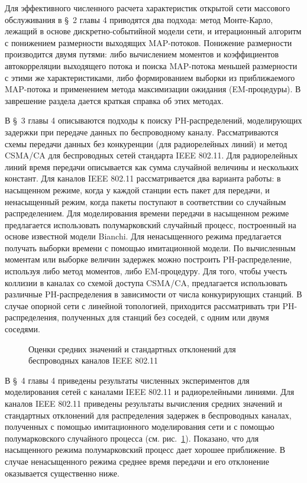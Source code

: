 Для эффективного численного расчета характеристик открытой сети массового обслуживания в \S~2 главы 4 приводятся два подхода: метод Монте-Карло, лежащий в основе дискретно-событийной модели сети, и итерационный алгоритм с понижением размерности выходящих MAP-потоков. Понижение размерности производится двумя путями: либо вычислением моментов и коэффициентов автокорреляции выходящего потока и поиска MAP-потока меньшей размерности с этими же характеристиками, либо формированием выборки из приближаемого MAP-потока и применением метода максимизации ожидания (EM-процедуры). В заврешение раздела дается краткая справка об этих методах.

В \S~3 главы 4 описываются подходы к поиску PH-распределений, моделирующих задержки при передаче данных по беспроводному каналу. Рассматриваются схемы передачи данных без конкуренции (для радиорелейных линий) и метод CSMA/CA для беспроводных сетей стандарта IEEE 802.11. Для радиорелейных линий время передачи описывается как сумма случайной величины и нескольких констант. Для каналов IEEE 802.11 рассматривается два варианта работы: в насыщенном режиме, когда у каждой станции есть пакет для передачи, и ненасыщенный режим, когда пакеты поступают в соответствии со случайным распределением. Для моделирования времени передачи в насыщенном режиме предлагается использовать полумарковский случайный процесс, построенный на основе известной модели Bianchi. Для ненасыщенного режима предлагается получать выборки времени с помощью имитационной модели. По вычисленным моментам или выборке величин задержек можно построить PH-распределение, используя либо метод моментов, либо EM-процедуру. Для того, чтобы учесть коллизии в каналах со схемой доступа CSMA/CA, предлагается использовать различные PH-распределения в зависимости от числа конкурирующих станций. В случае опорной сети с линейной топологией, приходится рассматривать три PH-распределения, полученных для станций без соседей, с одним или двумя соседями.

\begin{figure}[ht!]
  \caption{Оценки средних значений и стандартных отклонений для беспроводных каналов IEEE 802.11}\label{fig:fitting_dcf_means}
\end{figure}

В \S~4 главы 4 приведены результаты численных экспериментов для моделирования сетей с каналами IEEE 802.11 и радиорелейными линиями. Для каналов IEEE 802.11 приведены результаты вычисления средних значений и стандартных отклонений для распределения задержек в беспроводных каналах, полученных с помощью имитационного моделирования сети и с помощью полумарковского случайного процесса (см. рис.~\ref{fig:fitting_dcf_means}). Показано, что для насыщенного режима полумарковский процесс дает хорошее приближение. В случае ненасыщенного режима среднее время передачи и его отклонение оказывается существенно ниже.

